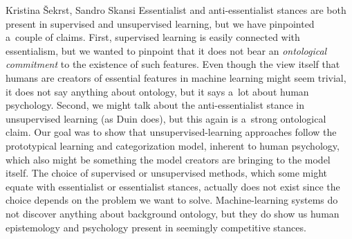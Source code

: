 \begin{artengenv2auth}{Kristina Šekrst, Sandro Skansi}
Essentialist and anti-essentialist stances are both present in supervised and unsupervised learning, but we have pinpointed a~couple of claims. First, supervised learning is easily connected with essentialism, but we wanted to pinpoint that it does not bear an \textit{ontological commitment} to the existence of such features. Even though the view itself that humans are creators of essential features in machine learning might seem trivial, it does not say anything about ontology, but it says a~lot about human psychology. Second, we might talk about the anti-essentialist stance in unsupervised learning (as Duin
\parencite*[][]{duin_dissimilarity_2015} %
 does), but this again is a~strong ontological claim. Our goal was to show that unsupervised-learning approaches follow the prototypical learning and categorization model, inherent to human psychology, which also might be something the model creators are bringing to the model itself. The choice of supervised or unsupervised methods, which some might equate with essentialist or essentialist stances, actually does not exist since the choice depends on the problem we want to solve. Machine-learning systems do not discover anything about background ontology, but they do show us human epistemology and psychology present in seemingly competitive stances.
 
 


\end{artengenv2auth}
\label{sekrst_stop}